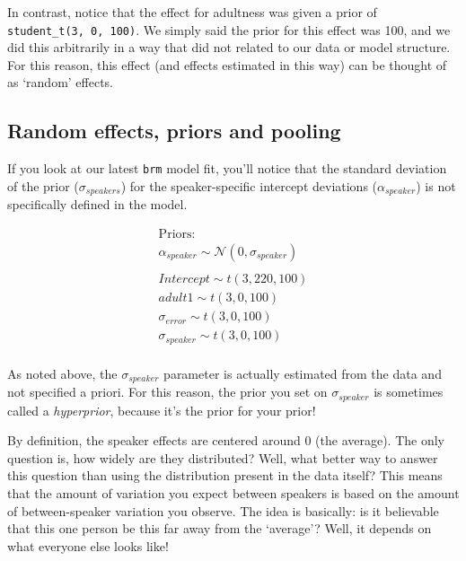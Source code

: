 \documentclass[
]{book}
\begin{document}
In contrast, notice that the effect for adultness was given a prior of \texttt{student\_t(3,\ 0,\ 100)}. We simply said the prior for this effect was 100, and we did this arbitrarily in a way that did not related to our data or model structure. For this reason, this effect (and effects estimated in this way) can be thought of as `random' effects.

\hypertarget{random-effects-priors-and-pooling}{%
\subsection{Random effects, priors and pooling}\label{random-effects-priors-and-pooling}}

If you look at our latest \texttt{brm} model fit, you'll notice that the standard deviation of the prior (\(\sigma_{speakers}\)) for the speaker-specific intercept deviations (\(\alpha_{speaker}\)) is not specifically defined in the model.

\begin{equation}
\begin{split}
\textrm{Priors:} \\
\alpha_{speaker} \sim \mathcal{N}(0,\sigma_{speaker}) \\ \\ 
Intercept \sim t(3, 220, 100) \\ 
adult1 \sim t(3, 0, 100) \\ 
\sigma_{error} \sim t(3, 0, 100) \\
\sigma_{speaker} \sim t(3, 0, 100) \\ 
\end{split}
\end{equation}

As noted above, the \(\sigma_{speaker}\) parameter is actually estimated from the data and not specified a priori. For this reason, the prior you set on \(\sigma_{speaker}\) is sometimes called a \emph{hyperprior}, because it's the prior for your prior!

By definition, the speaker effects are centered around 0 (the average). The only question is, how widely are they distributed? Well, what better way to answer this question than using the distribution present in the data itself? This means that the amount of variation you expect between speakers is based on the amount of between-speaker variation you observe. The idea is basically: is it believable that this one person be this far away from the `average'? Well, it depends on what everyone else looks like!
\end{document}

